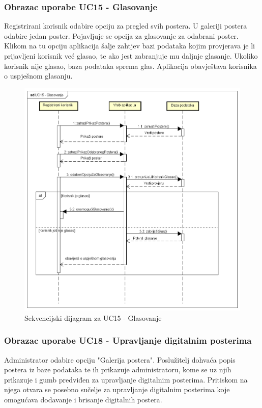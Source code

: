 				\subsubsection{Obrazac uporabe UC15 - Glasovanje}
				Registrirani korisnik odabire opciju za pregled svih postera. U galeriji postera odabire jedan poster. Pojavljuje se opcija za glasovanje za odabrani poster. Klikom na tu opciju aplikacija šalje zahtjev bazi podataka kojim provjerava je li prijavljeni korisnik već glasao, te ako jest zabranjuje mu daljnje glasanje. Ukoliko korisnik nije glasao, baza podataka sprema glas. Aplikacija obavještava korisnika o uspješnom glasanju.
				
				\begin{figure}[hp!]
				\includegraphics[width=\linewidth]{Slike/SD_Glasanje.png}
				\caption{Sekvencijski dijagram za UC15 - Glasovanje}
				\end{figure}
				
				\newpage
				
				\subsubsection{Obrazac uporabe UC18 - Upravljanje digitalnim posterima}
				Administrator odabire opciju "Galerija postera". Poslužitelj dohvaća popis postera iz baze podataka te ih prikazuje administratoru, kome se uz njih prikazuje i gumb predviđen za upravljanje digitalnim posterima. Pritiskom na njega otvara se posebno sučelje za upravljanje digitalnim posterima koje omogućava dodavanje i brisanje digitalnih postera.
				
